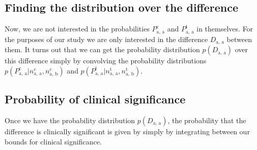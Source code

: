 \documentclass[10pt, twoside,a4paper]{article}
\begin{document}
\newpage
\subsection{Finding the distribution over the difference}\label{sec_difference}
Now, we are not interested in the probabilities $P^{\text{c}}_{\text{a, a}}$ and $P^{\text{t}}_{\text{a, a}}$ in themselves. For the purposes of our study we are only interested in the difference $D_{\text{a, a}}$ between them. It turns out that we can get the probability distribution $p \left( D_{\text{a, a}} \right)$ over this difference simply by convolving the probability distributions $p \left( P^{\text{c}}_{\text{a, a}} | n^c_{\text{a, a}}, n^c_{\text{a, b}} \right)$ and $p \left( P^{\text{t}}_{\text{a, a}} | n^{\text{t}}_{\text{a, a}}, n^{\text{t}}_{\text{a, b}} \right)$.


\newpage
\subsection{Probability of clinical significance}\label{sec_significance}
Once we have the probability distribution $p \left( D_{\text{a, a}} \right)$, the probability that the difference is clinically significant is given by simply by integrating between our bounds for clinical significance.


\newpage
\end{document}
